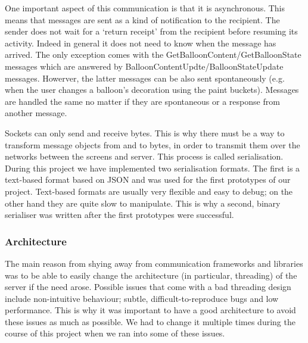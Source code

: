 One important aspect of this communication is that it is asynchronous. This 
means that messages are sent as a kind of notification to the recipient. The 
sender does not wait for a `return receipt' from the recipient before resuming 
its activity. Indeed in general it does not need to know when the message has
arrived. The only exception comes with the GetBalloonContent/GetBalloonState 
messages which are answered by BalloonContentUpdte/BalloonStateUpdate messages.
Howerver, the latter messages can be also sent spontaneously (e.g. when the user 
changes a balloon's decoration using the paint buckets). Messages are handled 
the same no matter if they are spontaneous or a response from another message.

Sockets can only send and receive bytes. This is why there must be a way to
transform message objects from and to bytes, in order to transmit them over the
networks between the screens and server. This process is called serialisation. 
During this project we have implemented two serialisation formats. The first is
a text-based format based on JSON and was used for the first prototypes of our 
project. Text-based formats are usually very flexible and easy to debug; on
the other hand they are quite slow to manipulate. This is why a second, binary
serialiser was written after the first prototypes were successful.


\subsubsection{Architecture}

The main reason from shying away from communication frameworks and libraries was
to be able to easily change the architecture (in particular, threading) of the 
server if the need arose. Possible issues that come with a bad threading design 
include non-intuitive behaviour; subtle, difficult-to-reproduce bugs and low 
performance. This is why it was important to have a good architecture to avoid 
these issues as much as possible. We had to change it multiple times during the 
course of this project when we ran into some of these issues.

